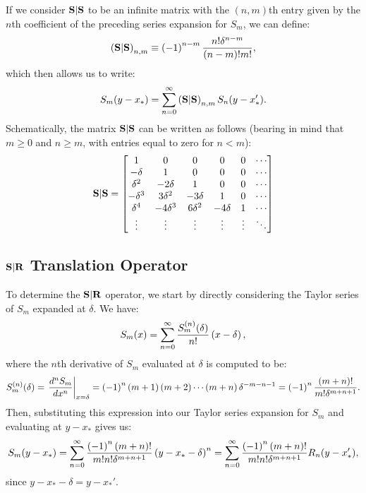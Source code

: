 If we consider $\bold{S}|\bold{S}$
to be an infinite matrix with the $(n,m)$th
entry given by the $n$th
coefficient of the preceding series expansion for $S_m$,
we can define:
\begin{align*}
  \left(\bold{S}|\bold{S}\right)_{n,m} \equiv \left(-1\right)^{n - m} {n! \delta^{n-m} \over \left(n - m\right)! m!},
\end{align*}
which then allows us to write:
\begin{align*}
  S_m(y - x_*) = \sum_{n=0}^\infty \left(\bold{S}|\bold{S}\right)_{n,m} S_n(y - x_*').
\end{align*}
Schematically, the matrix $\bold{S}|\bold{S}$
can be written as follows (bearing in mind that $m \geq 0$
and $n \geq m$, with entries equal to zero for $n < m$):
\begin{align*}
  \bold{S}|\bold{S} = \begin{bmatrix} 
    1 & 0 & 0 & 0 & 0 & \cdots \\
    -\delta & 1 & 0 & 0 & 0 & \cdots \\
    \delta^2 & -2\delta & 1 & 0 & 0 & \cdots \\
    -\delta^3 & 3\delta^2 & -3\delta & 1 & 0 & \cdots \\
    \delta^4 & -4\delta^3 & 6 \delta^2 & -4 \delta & 1 & \cdots \\
    \vdots & \vdots & \vdots & \vdots & \vdots & \ddots \\
  \end{bmatrix}
\end{align*}

\subsection{$\bold{S}|\bold{R}$ Translation Operator}

To determine the $\bold{S}|\bold{R}$
operator, we start by directly considering the Taylor series of $S_m$
expanded at $\delta$. We have:
\begin{align*}
  S_m(x) = \sum_{n=0}^\infty {S_m^{(n)}(\delta) \over n!} \left(x - \delta\right),
\end{align*}
where the $n$th
derivative of $S_m$ evaluated at $\delta$ is computed to be:
\begin{align*}
  S_m^{(n)}(\delta) = \left. {d^n S_m \over dx^n} \right|_{x = \delta} = \left(-1\right)^n \left(m+1\right) \left(m+2\right) \cdots \left(m+n\right) \delta^{-m-n-1} = \left(-1\right)^n {\left(m + n\right)! \over m! \delta^{m+n+1}}.
\end{align*}
Then, substituting this expression into our Taylor series expansion for
$S_m$ and evaluating at $y - x_*$ gives us:
\begin{align*}
  S_m(y - x_*) = \sum_{n=0}^\infty {\left(-1\right)^n \left(m + n\right)! \over m! n! \delta^{m + n + 1}} \left(y - x_* - \delta\right)^n = \sum_{n=0}^\infty {\left(-1\right)^n \left(m + n\right)! \over m! n! \delta^{m + n + 1}} R_n(y - x_*'),
\end{align*}
since $y - x_* - \delta = y - x_*'$.

